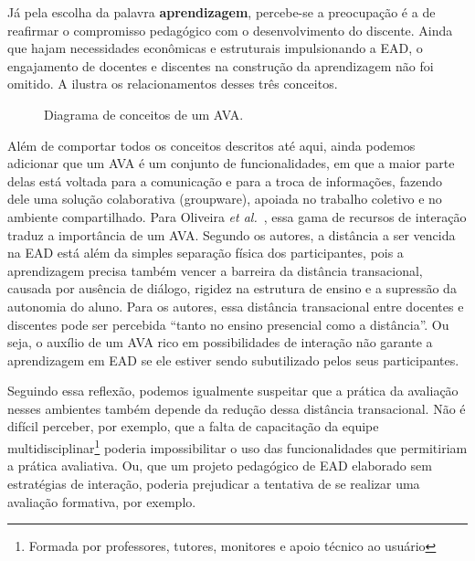 Já pela escolha da palavra \textbf{aprendizagem}, percebe-se a preocupação é a de reafirmar o compromisso pedagógico com o desenvolvimento do discente. Ainda que hajam necessidades econômicas e estruturais impulsionando a EAD, o engajamento de docentes e discentes na construção da aprendizagem não foi omitido. A  ilustra os  relacionamentos desses três conceitos.
\begin{figure}[h]
    \centering
    \caption{Diagrama de conceitos de um AVA.}
    \label{fig:ava}
\end{figure}  

Além de comportar todos os conceitos descritos até aqui, ainda podemos adicionar que um AVA é um conjunto de funcionalidades, em que a maior parte delas está  voltada para a comunicação e para a troca de informações, fazendo dele uma solução colaborativa (groupware), apoiada no trabalho coletivo e no ambiente compartilhado. Para Oliveira \textit{et al.}~\cite{dotta@ead}, essa gama de recursos de interação traduz a importância de um AVA. Segundo os autores, a distância a ser vencida na EAD está além da simples separação física dos participantes, pois a aprendizagem precisa também vencer a barreira da distância transacional, causada por ausência de diálogo, rigidez na estrutura de ensino e a supressão da autonomia do aluno. Para os autores, essa distância transacional entre docentes e discentes pode ser percebida ``tanto no ensino presencial como a distância''. Ou seja, o auxílio de um AVA rico em possibilidades de interação não garante a aprendizagem em EAD se ele estiver sendo subutilizado pelos seus participantes.

Seguindo essa reflexão, podemos igualmente suspeitar que a prática da avaliação nesses ambientes também depende da redução dessa distância transacional. Não é difícil perceber, por exemplo, que a falta de capacitação da equipe multidisciplinar\footnote{Formada por professores, tutores, monitores e apoio técnico ao usuário} poderia impossibilitar o uso das funcionalidades que permitiriam a prática avaliativa. Ou, que um projeto pedagógico de EAD elaborado sem estratégias de interação, poderia prejudicar a tentativa de se realizar uma avaliação formativa, por exemplo.

